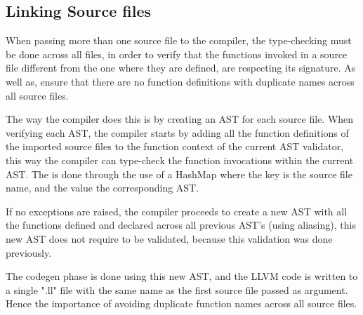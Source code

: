 \documentclass[12pt]{article}
\begin{document}
\newpage

\subsection{Linking Source files}
When passing more than one source file to the compiler, the type-checking must be done across all files, in order to verify that the functions invoked in a source file different from the one where they are defined, are respecting its signature. As well as, ensure that there are no function definitions with duplicate names across all source files.

The way the compiler does this is by creating an AST for each source file. When verifying each AST, the compiler starts by adding all the function definitions of the imported source files to the function context of the current AST validator, this way the compiler can type-check the function invocations within the current AST. The is done through the use of a HashMap where the key is the source file name, and the value the corresponding AST.

If no exceptions are raised, the compiler proceeds to create a new AST with all the functions defined and declared across all previous AST's (using aliasing), this new AST does not require to be validated, because this validation was done previously.

The codegen phase is done using this new AST, and the LLVM code is written to a single ".ll" file with the same name as the first source file passed as argument. Hence the importance of avoiding duplicate function names across all source files.

\end{document}
